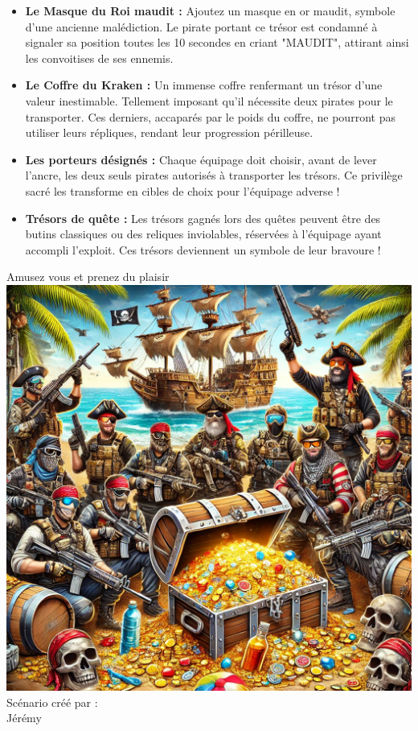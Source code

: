 \documentclass{pirategame}
\begin{document}
\begin{itemize}[resume*=extension]
    \item \textbf{Le Masque du Roi maudit :} Ajoutez un masque en or maudit, symbole d'une ancienne malédiction. Le pirate portant ce trésor est condamné à signaler sa position toutes les 10 secondes en criant "MAUDIT", attirant ainsi les convoitises de ses ennemis.
    \item \textbf{Le Coffre du Kraken :} Un immense coffre renfermant un trésor d'une valeur inestimable. Tellement imposant qu'il nécessite deux pirates pour le transporter. Ces derniers, accaparés par le poids du coffre, ne pourront pas utiliser leurs répliques, rendant leur progression périlleuse.
    \item \textbf{Les porteurs désignés :} Chaque équipage doit choisir, avant de lever l’ancre, les deux seuls pirates autorisés à transporter les trésors. Ce privilège sacré les transforme en cibles de choix pour l’équipage adverse !
    \item \textbf{Trésors de quête :} Les trésors gagnés lors des quêtes peuvent être des butins classiques ou des reliques inviolables, réservées à l’équipage ayant accompli l’exploit. Ces trésors deviennent un symbole de leur bravoure !
\end{itemize}


\vspace{2cm}

\begin{center}
  {\Huge Amusez vous et prenez du plaisir} \\
  \vspace{1.5cm}
  \includegraphics[width=0.6\linewidth]{img/end.png} \\
  \vspace{1cm}
  Scénario créé par :\\
  Jérémy
\end{center}
\end{document}
